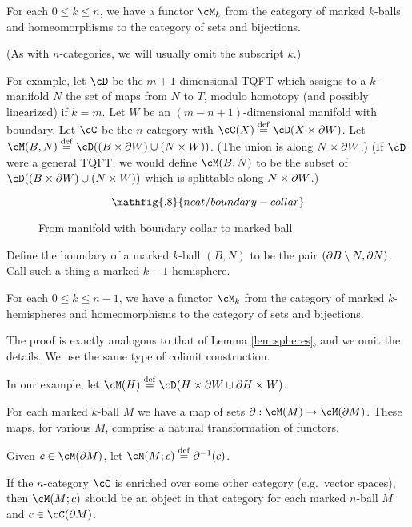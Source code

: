 \begin{module-axiom}
{For each $0 \le k \le n$, we have a functor $\cM_k$ from 
the category of marked $k$-balls and 
homeomorphisms to the category of sets and bijections.}
\end{module-axiom}

(As with $n$-categories, we will usually omit the subscript $k$.)

For example, let $\cD$ be the $m{+}1$-dimensional TQFT which assigns to a $k$-manifold $N$ the set 
of maps from $N$ to $T$, modulo homotopy (and possibly linearized) if $k=m$.
Let $W$ be an $(m{-}n{+}1)$-dimensional manifold with boundary.
Let $\cC$ be the $n$-category with $\cC(X) \deq \cD(X\times \bd W)$.
Let $\cM(B, N) \deq \cD((B\times \bd W)\cup (N\times W))$.
(The union is along $N\times \partial W$.)
(If $\cD$ were a general TQFT, we would define $\cM(B, N)$ to be
the subset of $\cD((B\times \bd W)\cup (N\times W))$ which is splittable along $N\times \partial W$.)

\begin{figure}[!ht]
$$\mathfig{.8}{ncat/boundary-collar}$$
\caption{From manifold with boundary collar to marked ball}\label{blah15}\end{figure}

Define the boundary of a marked $k$-ball $(B, N)$ to be the pair $(\partial B \setminus N, \partial N)$.
Call such a thing a {marked $k{-}1$-hemisphere}.

\begin{lem}
\label{lem:hemispheres}
{For each $0 \le k \le n-1$, we have a functor $\cM_k$ from 
the category of marked $k$-hemispheres and 
homeomorphisms to the category of sets and bijections.}
\end{lem}
The proof is exactly analogous to that of Lemma \ref{lem:spheres}, and we omit the details.
We use the same type of colimit construction.

In our example, let $\cM(H) \deq \cD(H\times\bd W \cup \bd H\times W)$.

\begin{module-axiom}
{For each marked $k$-ball $M$ we have a map of sets $\bd: \cM(M)\to \cM(\bd M)$.
These maps, for various $M$, comprise a natural transformation of functors.}
\end{module-axiom}

Given $c\in\cM(\bd M)$, let $\cM(M; c) \deq \bd^{-1}(c)$.

If the $n$-category $\cC$ is enriched over some other category (e.g.\ vector spaces),
then $\cM(M; c)$ should be an object in that category for each marked $n$-ball $M$
and $c\in \cC(\bd M)$.


